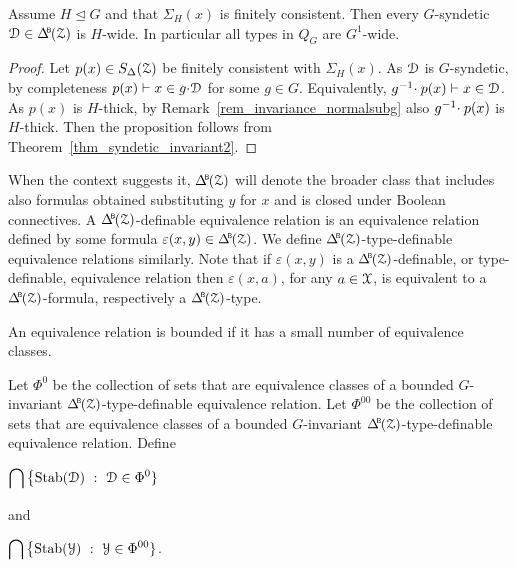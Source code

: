 \begin{proposition}\label{prop_Gsyndetic_Hthick1}
  Assume $H\trianglelefteq G$ and that $\Sigma_H(x)$ is finitely consistent.
  Then every $G$-syndetic $\D\in\BDelta(\Z)$ is $H$-wide.
  In particular all types in $Q_G$ are $G^1$-wide.
\end{proposition}

\begin{proof}
  Let $p(x)\in S_\Delta(\EuScript Z)$ be finitely consistent with $\Sigma_H(x)$.
  As $\EuScript D$ is $G$-syndetic, by completeness $p(x)\vdash x\in g{\cdot}\EuScript D$ for some $g\in G$.
  Equivalently, $g^{-1}\kern-.5ex\cdot p(x)\vdash x\in\EuScript D$.
  As $p(x)$ is $H$-thick, by Remark~\ref{rem_invariance_normalsubg} also $g^{-1}\kern-.5ex\cdot p(x)$ is $H$-thick.
  Then the proposition follows from Theorem~\ref{thm_syndetic_invariant2}.
\end{proof}

When the context suggests it, $\BDelta(\Z)$ will denote the broader class that includes also formulas obtained substituting $y$ for $x$ and is closed under Boolean connectives.
A $\BDelta(\Z)$-definable equivalence relation is an equivalence relation defined by some formula $\varepsilon(x,y)\in\BDelta(\Z)$.
We define $\BDelta(\Z)$-type-definable equivalence relations similarly.
Note that if $\varepsilon(x,y)$ is a $\BDelta(\Z)$-definable, or type-definable, equivalence relation then $\varepsilon(x,a)$, for any $a\in\EuScript X$, is equivalent to a $\BDelta(\Z)$-formula, respectively a $\BDelta(\Z)$-type.

An equivalence relation is bounded if it has a small number of equivalence classes.

\begin{definition}\label{def_G00}
  Let $\Phi^0$ be the collection of sets that are equivalence classes of a bounded $G$-invariant $\BDelta(\Z)$-type-definable equivalence relation.
  Let $\Phi^{00}$ be the collection of sets that are equivalence classes of a bounded $G$-invariant $\BDelta(\Z)$-type-definable equivalence relation.
  Define
  \smallskip

  \medrel{=}$\displaystyle\bigcap\big\{{\rm Stab}(\D)\ :\  \D\in\Phi^0\}$

  and

  \medrel{=}$\displaystyle\bigcap\big\{{\rm Stab}(\Y)\ :\  \Y\in\Phi^{00}\}$.

\end{definition}

